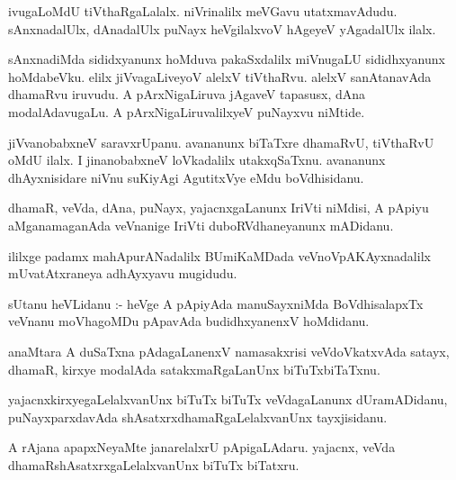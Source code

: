 \documentclass{article}
\begin{document}
\begin{mn}
ivugaLoMdU tiVthaRgaLalalx.  niVrinalilx meVGavu utatxmavAdudu.  sAnxnadalUlx,  
dAnadalUlx puNayx heVgilalxvoV hAgeyeV yAgadalUlx ilalx.
\end{mn}

\begin{mn}
sAnxnadiMda sididxyanunx hoMduva  pakaSxdalilx  miVnugaLU  sididhxyanunx hoMdabeVku.  
elilx jiVvagaLiveyoV alelxV  tiVthaRvu.  alelxV sanAtanavAda dhamaRvu iruvudu.  
A pArxNigaLiruva jAgaveV tapasusx, dAna modalAdavugaLu.  A pArxNigaLiruvalilxyeV puNayxvu niMtide.
\end{mn}

\begin{mn}
jiVvanobabxneV  saravxrUpanu.  avananunx  biTaTxre dhamaRvU, tiVthaRvU oMdU ilalx.  I jinanobabxneV 
loVkadalilx utakxqSaTxnu.  avananunx dhAyxnisidare niVnu suKiyAgi AgutitxVye  eMdu boVdhisidanu.
\end{mn}

\begin{mn}
dhamaR, veVda, dAna, puNayx, yajacnxgaLanunx  IriVti  niMdisi,  A pApiyu  
aMganamaganAda  veVnanige IriVti duboRVdhaneyanunx mADidanu.
\end{mn}

\begin{mn}
ililxge padamx mahApurANadalilx BUmiKaMDada veVnoVpAKAyxnadalilx mUvatAtxraneya adhAyxyavu mugidudu.
\end{mn}

\begin{mn}sUtanu heVLidanu :- heVge A pApiyAda manuSayxniMda BoVdhisalapxTx 
veVnanu moVhagoMDu pApavAda budidhxyanenxV hoMdidanu.
\end{mn}

\begin{mn}
anaMtara A duSaTxna pAdagaLanenxV  namasakxrisi veVdoVkatxvAda satayx, dhamaR, 
kirxye modalAda satakxmaRgaLanUnx biTuTxbiTaTxnu.
\end{mn}

\begin{mn}
yajacnxkirxyegaLelalxvanUnx  biTuTx biTuTx  veVdagaLanunx  dUramADidanu,  puNayxparxdavAda 
shAsatxrxdhamaRgaLelalxvanUnx tayxjisidanu.
\end{mn}

\begin{mn}
A rAjana apapxNeyaMte janarelalxrU  pApigaLAdaru.  yajacnx, veVda dhamaRshAsatxrxgaLelalxvanUnx biTuTx biTatxru.
\end{mn}
\end{document}
